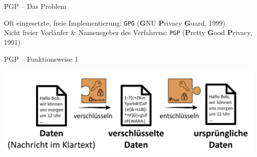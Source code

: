 \documentclass{beamer}
\begin{document}
\begin{frame}[label=bg2]{PGP – Das Problem}
  \pause

  {\tiny Oft eingesetzte, freie Implementierung: \texttt{GPG} (\textbf{G}NU \textbf{P}rivacy \textbf{G}uard, 1999)\\
  Nicht freier Vorläufer \& Namensgeber des Verfahrens: \texttt{PGP} (\textbf{P}retty \textbf{G}ood \textbf{P}rivacy, 1991)}


\end{frame}


\begin{frame}{PGP – Funktionsweise 1}

\begin{center}
\includegraphics[width=\textwidth]{img-src/pgp_ver_entschluesseln.png}
\end{center}
\end{frame}

\end{document}
